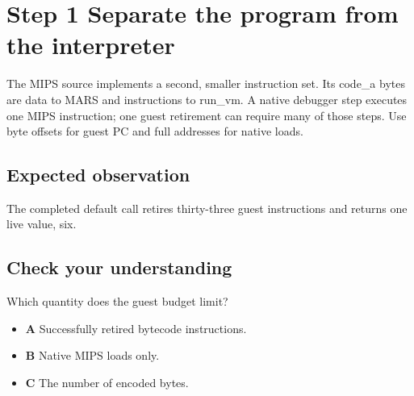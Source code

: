 \section{Step 1 Separate the program from the interpreter}\label{vm-s01}

The MIPS source implements a second, smaller instruction set. Its code\_a bytes are data to MARS and instructions to run\_vm. A native debugger step executes one MIPS instruction; one guest retirement can require many of those steps. Use byte offsets for guest PC and full addresses for native loads.

\subsection{Expected observation}
The completed default call retires thirty-three guest instructions and returns one live value, six.

\subsection{Check your understanding}
Which quantity does the guest budget limit?

\begin{itemize}
  \item \textbf{A} Successfully retired bytecode instructions.
  \item \textbf{B} Native MIPS loads only.
  \item \textbf{C} The number of encoded bytes.
\end{itemize}

